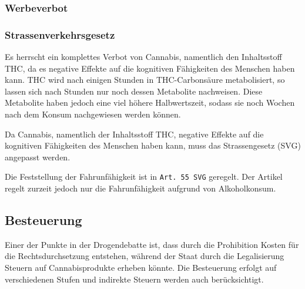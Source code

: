 \documentclass[../main.tex]{subfiles}
\begin{document}
	 \subsubsection{Werbeverbot}
	 
	 
	 
	 
	

	 
	 \subsubsection{Strassenverkehrsgesetz}
	 Es herrscht ein komplettes Verbot von Cannabis, namentlich den Inhaltsstoff THC, da es negative Effekte auf die kognitiven Fähigkeiten des Menschen haben kann.
	 THC wird nach einigen Stunden in THC-Carbonsäure metabolisiert, so lassen sich nach Stunden nur noch dessen Metabolite nachweisen.
	 Diese Metabolite haben jedoch eine viel höhere Halbwertszeit, sodass sie noch Wochen nach dem Konsum nachgewiesen werden können.
	 
	 
	 Da Cannabis, namentlich der Inhaltsstoff THC, negative Effekte auf die kognitiven Fähigkeiten des Menschen haben kann, muss das Strassengesetz (SVG) angepasst werden. 
	 
	 Die Feststellung der Fahrunfähigkeit ist in \texttt{Art. 55 SVG} geregelt.
	 Der Artikel regelt zurzeit jedoch nur die Fahrunfähigkeit aufgrund von Alkoholkonsum. 
	 
	 \subsection{Besteuerung}
	 Einer der Punkte in der Drogendebatte ist, dass durch die Prohibition Kosten für die Rechtsdurchsetzung entstehen, während der Staat durch die Legalisierung Steuern auf Cannabisprodukte erheben könnte. 
	 Die Besteuerung erfolgt auf verschiedenen Stufen und indirekte Steuern werden auch berücksichtigt.
	 
\end{document}
